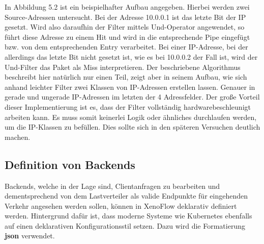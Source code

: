 In Abbildung 5.2 ist ein beispielhafter Aufbau angegeben. Hierbei werden zwei Source-Adressen untersucht. Bei der Adresse 10.0.0.1 ist das letzte Bit der IP gesetzt. Wird also daraufhin der Filter mittels Und-Operator angewendet, so führt diese Adresse zu einem Hit und wird in die entsprechende Pipe eingefügt bzw. von dem entsprechenden Entry verarbeitet. Bei einer IP-Adresse, bei der allerdings das letzte Bit nicht gesetzt ist, wie es bei 10.0.0.2 der Fall ist, wird der Und-Filter das Paket als Miss interpretieren. Der beschriebene Algorithmus beschreibt hier natürlich nur einen Teil, zeigt aber in seinem Aufbau, wie sich anhand leichter Filter zwei Klassen von IP-Adressen erstellen lassen. Genauer in gerade und ungerade IP-Adressen im letzten der 4 Adressfelder. Der große Vorteil dieser Implementierung ist es, dass der Filter vollständig hardwarebeschleunigt arbeiten kann. Es muss somit keinerlei Logik oder ähnliches durchlaufen werden, um die IP-Klassen zu befüllen. Dies sollte sich in den späteren Versuchen deutlich machen.
\subsection{Definition von Backends}
Backends, welche in der Lage sind, Clientanfragen zu bearbeiten und dementsprechend von dem Lastverteiler als valide Endpunkte für eingehenden Verkehr angesehen werden sollen, können in XenoFlow deklarativ definiert werden. Hintergrund dafür ist, dass moderne Systeme wie Kubernetes ebenfalls auf einen deklarativen Konfigurationsstil setzen. Dazu wird die Formatierung \textbf{json} verwendet. 

